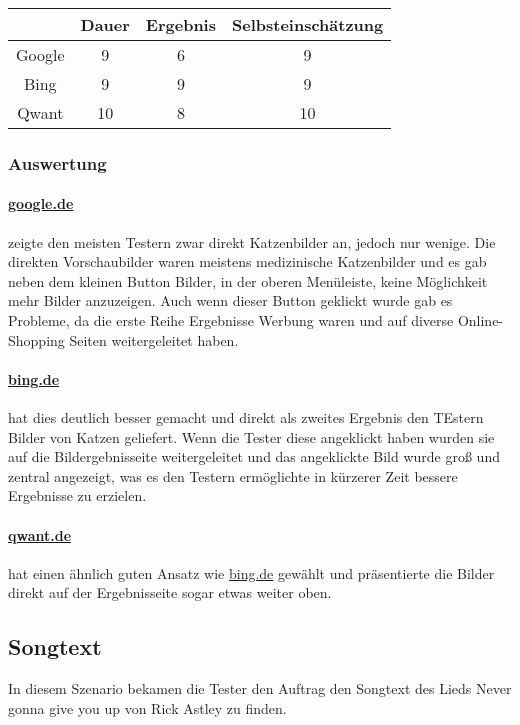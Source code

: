 \begin{tabular}{|c|c|c|c|}
    \hline
    & Dauer & Ergebnis & Selbsteinschätzung \\
    \hline
    Google & 9     & 6        & 9                  \\
    \hline
    Bing   & 9     & 9        & 9                  \\
    \hline
    Qwant  & 10    & 8       & 10                 \\
    \hline
\end{tabular}

\subsubsection*{Auswertung}
\paragraph{\url{google.de}} zeigte den meisten Testern zwar direkt Katzenbilder an, jedoch nur wenige.
Die direkten Vorschaubilder waren meistens medizinische Katzenbilder und es gab neben dem kleinen Button Bilder, in der oberen Menüleiste, keine Möglichkeit mehr Bilder anzuzeigen.
Auch wenn dieser Button geklickt wurde gab es Probleme, da die erste Reihe Ergebnisse Werbung waren und auf diverse Online-Shopping Seiten weitergeleitet haben.\\

\paragraph{\url{bing.de}} hat dies deutlich besser gemacht und direkt als zweites Ergebnis den TEstern Bilder von Katzen geliefert.
Wenn die Tester diese angeklickt haben wurden sie auf die Bildergebnisseite weitergeleitet und das angeklickte Bild wurde groß und zentral angezeigt,
was es den Testern ermöglichte in kürzerer Zeit bessere Ergebnisse zu erzielen.\\

\paragraph{\url{qwant.de}} hat einen ähnlich guten Ansatz wie \url{bing.de} gewählt und präsentierte die Bilder direkt auf der Ergebnisseite sogar etwas weiter oben.

\subsection{Songtext}\label{subsec:szenario3}
In diesem Szenario bekamen die Tester den Auftrag den Songtext des Lieds Never gonna give you up von Rick Astley zu finden.

